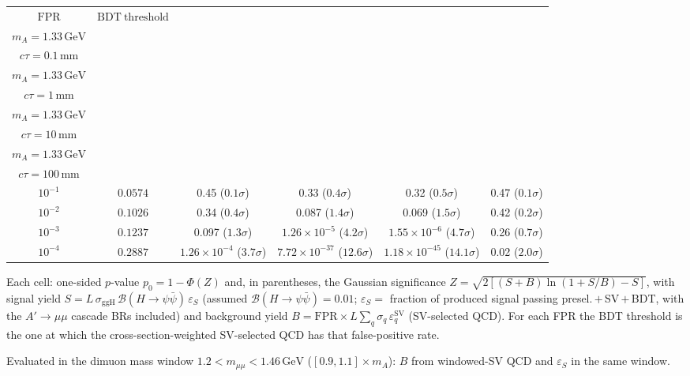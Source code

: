 \documentclass[10pt,a4paper]{article}
\begin{document}
{\begin{tabular}{cccccc}
\toprule
$\mathrm{FPR}$ & $\mathrm{BDT\ threshold}$ & \shortstack{$m_{\pi}=4\,\mathrm{GeV}$\\$m_{A}=1.33\,\mathrm{GeV}$\\$c\tau=0.1\,\mathrm{mm}$} & \shortstack{$m_{\pi}=4\,\mathrm{GeV}$\\$m_{A}=1.33\,\mathrm{GeV}$\\$c\tau=1\,\mathrm{mm}$} & \shortstack{$m_{\pi}=4\,\mathrm{GeV}$\\$m_{A}=1.33\,\mathrm{GeV}$\\$c\tau=10\,\mathrm{mm}$} & \shortstack{$m_{\pi}=4\,\mathrm{GeV}$\\$m_{A}=1.33\,\mathrm{GeV}$\\$c\tau=100\,\mathrm{mm}$} \\
\midrule
$10^{-1}$ & $0.0574$ & 0.45 ($0.1\sigma$) & 0.33 ($0.4\sigma$) & 0.32 ($0.5\sigma$) & 0.47 ($0.1\sigma$)\\
$10^{-2}$ & $0.1026$ & 0.34 ($0.4\sigma$) & 0.087 ($1.4\sigma$) & 0.069 ($1.5\sigma$) & 0.42 ($0.2\sigma$)\\
$10^{-3}$ & $0.1237$ & 0.097 ($1.3\sigma$) & $1.26\times10^{-5}$ ($4.2\sigma$) & $1.55\times10^{-6}$ ($4.7\sigma$) & 0.26 ($0.7\sigma$)\\
$10^{-4}$ & $0.2887$ & $1.26\times10^{-4}$ ($3.7\sigma$) & $7.72\times10^{-37}$ ($12.6\sigma$) & $1.18\times10^{-45}$ ($14.1\sigma$) & 0.02 ($2.0\sigma$)\\
\bottomrule
\end{tabular}

{\small Each cell: one-sided $p$-value $p_0=1-\Phi(Z)$ and, in parentheses, the Gaussian significance $Z=\sqrt{2\left[(S{+}B)\ln(1{+}S/B)-S\right]}$, with signal yield $S=L\,\sigma_{\mathrm{ggH}}\,\mathcal{B}(H\to\psi\bar{\psi})\,\varepsilon_S$ (assumed $\mathcal{B}(H\to\psi\bar{\psi})=0.01$; $\varepsilon_S=$ fraction of produced signal passing presel.\,$+$\,SV\,$+$\,BDT, with the $A'\to\mu\mu$ cascade BRs included) and background yield $B=\mathrm{FPR}\times L\sum_q\sigma_q\,\varepsilon_q^{\mathrm{SV}}$ (SV-selected QCD). For each FPR the BDT threshold is the one at which the cross-section-weighted SV-selected QCD has that false-positive rate.}

{\small Evaluated in the dimuon mass window $1.2<m_{\mu\mu}<1.46\,\mathrm{GeV}$ ($[0.9,1.1]\times m_A$): $B$ from windowed-SV QCD and $\varepsilon_S$ in the same window.}

}\clearpage
\end{document}
